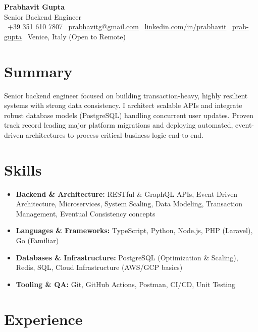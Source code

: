 \documentclass[a4paper,10pt]{article}
\begin{document}
\begin{center}
 {\Huge\bfseries Prabhavit Gupta}\\[3pt]
 {\color{accent}\large Senior Backend Engineer}\\[5pt]
 \faPhone\ +39 351 610 7807 \quad
 \faEnvelope\ \href{mailto:prabhavitg@gmail.com}{prabhavitg@gmail.com} \quad
 \faLinkedin\ \href{https://www.linkedin.com/in/prabhavit/}{linkedin.com/in/prabhavit} \quad
 \faGithub\ \href{https://github.com/prab-gupta}{prab-gupta} \quad
 \faMapMarker*\ Venice, Italy (Open to Remote)
\end{center}

\section{Summary}
Senior backend engineer focused on building transaction-heavy, highly resilient systems with strong data consistency. I architect scalable APIs and integrate robust database models (PostgreSQL) handling concurrent user updates. Proven track record leading major platform migrations and deploying automated, event-driven architectures to process critical business logic end-to-end.

\section{Skills}
\begin{itemize}
 \item \textbf{Backend \& Architecture:} RESTful \& GraphQL APIs, Event-Driven Architecture, Microservices, System Scaling, Data Modeling, Transaction Management, Eventual Consistency concepts
 \item \textbf{Languages \& Frameworks:} TypeScript, Python, Node.js, PHP (Laravel), Go (Familiar)
 \item \textbf{Databases \& Infrastructure:} PostgreSQL (Optimization \& Scaling), Redis, SQL, Cloud Infrastructure (AWS/GCP basics)
 \item \textbf{Tooling \& QA:} Git, GitHub Actions, Postman, CI/CD, Unit Testing
\end{itemize}

\section{Experience}
\end{document}
